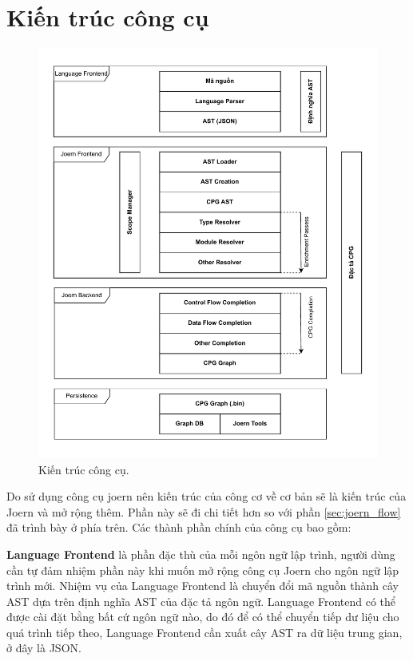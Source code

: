 \section{Kiến trúc công cụ}

\begin{figure}[H]
	\includegraphics[width=1\columnwidth]{figures/c3/c3_arch.drawio.pdf}
	\centering
	\caption{Kiến trúc công cụ.}
	\label{img:c3_arch}
\end{figure}

Do sử dụng công cụ joern nên kiến trúc của công cơ về cơ bản sẽ là kiến trúc của Joern và mở rộng thêm. Phần này sẽ đi chi tiết hơn so với phần \ref{sec:joern_flow} đã trình bày ở phía trên. Các thành phần chính của công cụ bao gồm:

\textbf{Language Frontend} là phần đặc thù của mỗi ngôn ngữ lập trình, người dùng cần tự đảm nhiệm phần này khi muốn mở rộng công cụ Joern cho ngôn ngữ lập trình mới. Nhiệm vụ của Language Frontend là chuyển đổi mã nguồn thành cây AST dựa trên định nghĩa AST của đặc tả ngôn ngữ. Language Frontend có thể được cài đặt bằng bất cứ ngôn ngữ nào, do đó để có thể chuyển tiếp dư liệu cho quá trình tiếp theo, Language Frontend cần xuất cây AST ra dữ liệu trung gian, ở đây là JSON.

